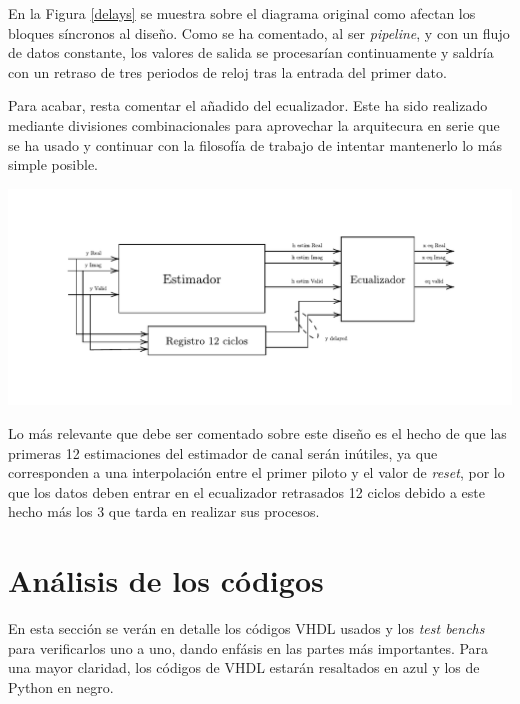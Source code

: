 \documentclass[11pt]{scrartcl} %
\begin{document}
\begin{preview}
En la Figura \ref{delays} se muestra sobre el diagrama original como afectan los bloques síncronos al diseño. Como se ha comentado, al ser \emph{pipeline}, y con un flujo de datos constante, los valores de salida se procesarían continuamente y saldría con un retraso de tres periodos de reloj tras la entrada del primer dato. 

Para acabar, resta comentar el añadido del ecualizador. Este ha sido realizado mediante divisiones combinacionales para aprovechar la arquitecura en serie que se ha usado y continuar con la filosofía de trabajo de intentar mantenerlo lo más simple posible.

\begin{minipage}{\linewidth}
	\begin{center}
		\includegraphics[width=1\columnwidth,trim={0 1cm 1cm 0},clip]{./Figures/diagrameq.pdf} %
	\end{center}
	\label{ecualizador}
\end{minipage}

Lo más relevante que debe ser comentado sobre este diseño es el hecho de que las primeras 12 estimaciones del estimador de canal serán inútiles, ya que corresponden a una interpolación entre el primer piloto y el valor de \emph{reset}, por lo que los datos deben entrar en el ecualizador retrasados 12 ciclos debido a este hecho más los 3 que tarda en realizar sus procesos.

\Newpage

\section{Análisis de los códigos}

En esta sección se verán en detalle los códigos VHDL usados y los \emph{test benchs} para verificarlos uno a uno, dando enfásis en las partes más importantes. Para una mayor claridad, los códigos de VHDL estarán resaltados en azul y los de Python en negro.


\end{preview}
\end{document}
